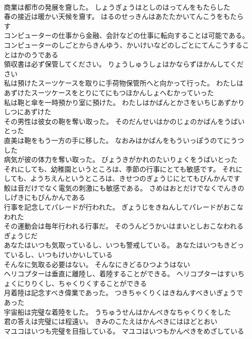 \documentclass[8pt]{extreport}
\begin{document}
\begin{CJK}{UTF8}{min}
\\	商業は都市の発展を齎した。	しょうぎょうはとしのはってんをもたらした 
\\	春の接近は暖かい天候を齎す。	はるのせっきんはあたたかいてんこうをもたらす 
\\	コンピューターの仕事から金融、会計などの仕事に転向することは可能である。	コンピューターのしごとからきんゆう、かいけいなどのしごとにてんこうすることはかのうである 
\\	領収書は必ず保管してください。	りょうしゅうしょはかならずほかんしてください 
\\	私は預けたスーツケースを取りに手荷物保管所へと向かって行った。	わたしはあずけたスーツケースをとりにてにもつほかんしょへむかっていった 
\\	私は鞄と傘を一時預かり室に預けた。	わたしはかばんとかさをいちじあずかりしつにあずけた 
\\	その男性は彼女の鞄を奪い取った。	そのだんせいはかのじょのかばんをうばいとった 
\\	直美は鞄をもう一方の手に移した。	なおみはかばんをもういっぽうのてにうつした 
\\	病気が彼の体力を奪い取った。	びょうきがかれのたいりょくをうばいとった 
\\	それにしても、幼稚園というところは、季節の行事にとても敏感です。	それにしても、ようちえんというところは、きせつのぎょうじにとてもびんかんです 
\\	鮫は音だけでなく電気の刺激にも敏感である。	さめはおとだけでなくでんきのしげきにもびんかんである 
\\	行事を記念してパレードが行われた。	ぎょうじをきねんしてパレードがおこなわれた 
\\	その運動会は毎年行われる行事だ。	そのうんどうかいはまいとしおこなわれるぎょうじだ 
\\	あなたはいつも気取っているし、いつも警戒している。	あなたはいつもきどっているし、いつもけいかいしている 
\\	そんなに気取る必要はない。	そんなにきどるひつようはない 
\\	ヘリコプターは垂直に離陸し、着陸することができる。	ヘリコプターはすいちょくにりりくし、ちゃくりくすることができる 
\\	月着陸は記念すべき偉業であった。	つきちゃくりくはきねんすべきいぎょうであった 
\\	宇宙船は完璧な着陸をした。	うちゅうせんはかんぺきなちゃくりくをした 
\\	君の答えは完璧には程遠い。	きみのこたえはかんぺきにはほどとおい 
\\	マユコはいつも完璧を目指している。	マユコはいつもかんぺきをめざしている 

\end{CJK}
\end{document}
